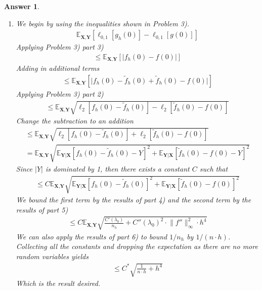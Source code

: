 \documentclass[12pt]{article}
\theoremstyle{colon}
\newtheorem*{answer}{Answer}
\begin{document}
\begin{answer}
\begin{enumerate}[label=\arabic*)]
\begin{enumerate}[label=\alph*)]
        \item We begin by using the inequalities shown in Problem 3).
          \begin{gather*}
            \mathbb{E}_{\textbf{X}, \textbf{Y}} \left[ \ell_{0,1}[g_h(0)] - \ell_{0,1}[g(0)] \right]
          \end{gather*}
          Applying Problem 3) part 3)
          \begin{gather*}
            \leq \mathbb{E}_{\textbf{X}, \textbf{Y}} \left[ \lvert f_h(0) - f(0) \rvert \right]
          \end{gather*}
          Adding in additional terms
          \begin{gather*}
            \leq \mathbb{E}_{\textbf{X}, \textbf{Y}} \left[ \lvert f_h(0) - \tilde{f}_h(0) + \tilde{f}_h(0) - f(0) \rvert \right]
          \end{gather*}
          Applying Problem 3) part 2)
          \begin{gather*}
            \leq \mathbb{E}_{\textbf{X}, \textbf{Y}} \sqrt{ \ell_2 [f_h(0) - \tilde{f}_h(0)] - \ell_2 [\tilde{f}_h(0) - f(0)] }
          \end{gather*}
          Change the subtraction to an addition
          \begin{gather*}
            \leq \mathbb{E}_{\textbf{X}, \textbf{Y}} \sqrt{ \ell_2 [f_h(0) - \tilde{f}_h(0)] + \ell_2 [\tilde{f}_h(0) - f(0)] } \\
            = \mathbb{E}_{\textbf{X}, \textbf{Y}} \sqrt{ \mathbb{E}_{\textbf{Y} | \textbf{X}} [f_h(0) - \tilde{f}_h(0) - Y]^2 + \mathbb{E}_{\textbf{Y} | \textbf{X}} [\tilde{f}_h(0) - f(0) - Y ]^2 }
          \end{gather*}
          Since $\lvert Y \rvert$ is dominated by 1, then there exists a constant $C$ such that
          \begin{gather*}
            \leq C \mathbb{E}_{\textbf{X}, \textbf{Y}} \sqrt{ \mathbb{E}_{\textbf{Y} | \textbf{X}} [f_h(0) - \tilde{f}_h(0)]^2 + \mathbb{E}_{\textbf{Y} | \textbf{X}} [\tilde{f}_h(0) - f(0)]^2 }
          \end{gather*}
          We bound the first term by the results of part 4) and the second term by the results of part 5)
          \begin{gather*}
            \leq C \mathbb{E}_{\textbf{X}, \textbf{Y}} \sqrt{ \frac{C'(\lambda_0)}{n_h} + C''(\lambda_0)^2 \cdot \lVert f'' \rVert_\infty^2 \cdot h^4}
          \end{gather*}
          We can also apply the results of part 6) to bound $1/n_h$ by $1/(n \cdot h)$. Collecting all the constants and dropping the expectation as there are no more random variables yields
          \begin{gather*}
            \leq C^* \sqrt{ \frac{1}{n \cdot h} +  h^4}
          \end{gather*}
          Which is the result desired.
      \end{enumerate}
  \end{enumerate}
\end{answer}
\end{document}
